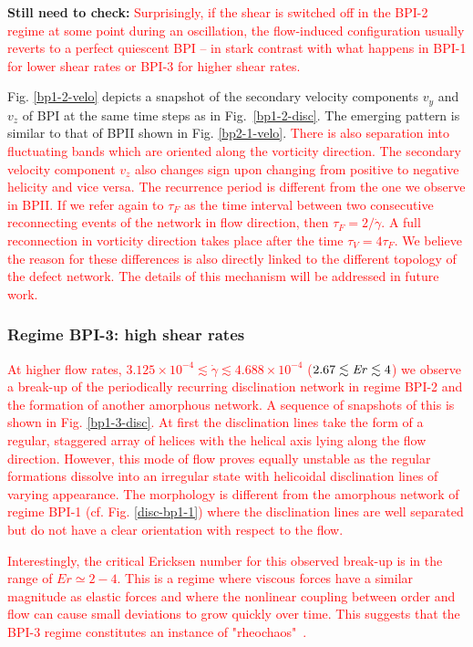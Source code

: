 \documentclass[8.5pt,twoside,twocolumn]{article}
\newcommand{\e}[1]{\times10^{#1}}
\newcommand{\gd}{\dot{\gamma}}
\newcommand{\com}[1]{{\bf {#1}}}
\newcommand{\rev}[1]{{\textcolor{red}{#1}}}
\begin{document}
\com{Still need to check:} 
\rev{
Surprisingly, if the shear is switched off in
the BPI-2 regime at some point during an oscillation, 
the flow-induced configuration usually
reverts to a perfect quiescent BPI -- in stark contrast with
what happens in BPI-1 for lower shear rates or BPI-3 for higher shear rates. 
}

Fig. \ref{bp1-2-velo} depicts a snapshot of the secondary velocity 
components $v_y$ and $v_z$ of BPI at the same time steps as in Fig.~\ref{bp1-2-disc}. 
The emerging pattern is similar to that of BPII shown in
Fig. \ref{bp2-1-velo}. 
\rev{
There is also separation into fluctuating bands 
which are oriented along the vorticity direction.
The secondary velocity component $v_z$ also changes sign upon
changing from positive to negative helicity and vice versa.
The recurrence period is different from the one we observe in BPII.
If we refer again to $\tau_F$ as the time interval between two consecutive 
reconnecting events of the network in flow direction, then $\tau_F=2/\gd$. 
A full reconnection in vorticity direction takes place after the time $\tau_V=4 \tau_F$.
We believe the reason for these differences is also directly linked to the different
topology of the defect network. The details of this mechanism will be
addressed in future work.
} 

\subsubsection{Regime BPI-3: high shear rates }

\rev{
At higher flow rates, $3.125\e{-4}\lesssim\gd\lesssim4.688\e{-4}$ 
($2.67\lesssim {\it Er}\lesssim 4$) we observe a break-up of the 
periodically recurring disclination network in regime BPI-2 and the formation
of another amorphous network. A sequence of snapshots of this is shown in Fig. \ref{bp1-3-disc}. 
At first the disclination lines take the form of a regular, staggered array of helices 
with the helical axis lying along the flow direction.
However, this mode of flow proves equally unstable as the regular formations dissolve into 
an irregular state with helicoidal disclination lines of varying 
appearance. The morphology is different from the amorphous network of
regime BPI-1 (cf. Fig. \ref{disc-bp1-1}) where the disclination lines are 
well separated but do not have a clear orientation with respect to the flow. 
}

\rev{
Interestingly, the critical Ericksen number for this observed break-up is in 
the range of $Er\simeq 2-4$. This is a regime where viscous forces have a 
similar magnitude as elastic forces and where the nonlinear coupling between
order and flow can cause small deviations to grow quickly over time. 
This suggests that the BPI-3 regime constitutes an instance 
of "rheochaos"~\cite{rheochaos,Cates:2002}.
}
\end{document}
